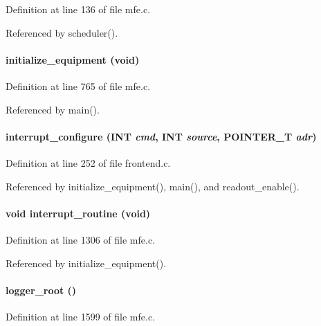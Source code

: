 Definition at line 136 of file mfe.c.

Referenced by scheduler().
\paragraph[{initialize\_\-equipment}]{ initialize\_\-equipment (void)}\hfill\label{mfe_8c_a7755389a61fd0afb9b11bc68a2218058}


Definition at line 765 of file mfe.c.

Referenced by main().
\paragraph[{interrupt\_\-configure}]{ interrupt\_\-configure ({\bf INT} {\em cmd}, \/  {\bf INT} {\em source}, \/  POINTER\_\-T {\em adr})}\hfill\label{mfe_8c_a681a5d1fe2e8a4735bcf03824ffb3e81}


Definition at line 252 of file frontend.c.

Referenced by initialize\_\-equipment(), main(), and readout\_\-enable().
\paragraph[{interrupt\_\-routine}]{\setlength{\rightskip}{0pt plus 5cm}void interrupt\_\-routine (void)}\hfill\label{mfe_8c_a8b84b3b4051dae0ba00258a3c885c0c7}


Definition at line 1306 of file mfe.c.

Referenced by initialize\_\-equipment().
\paragraph[{logger\_\-root}]{ logger\_\-root ()}\hfill\label{mfe_8c_ace89325172f363d2efd92735e52ec69e}


Definition at line 1599 of file mfe.c.

